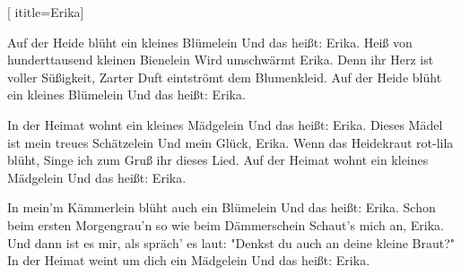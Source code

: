  [
ititle={Erika}]

\beginverse
Auf der Heide blüht ein kleines Blümelein
Und das heißt: Erika.
Heiß von hunderttausend kleinen Bienelein
Wird umschwärmt Erika.
Denn ihr Herz ist voller Süßigkeit,
Zarter Duft eintströmt dem Blumenkleid.
Auf der Heide blüht ein kleines Blümelein
Und das heißt: Erika.
\endverse

\beginverse
In der Heimat wohnt ein kleines Mädgelein
Und das heißt: Erika.
Dieses Mädel ist mein treues Schätzelein
Und mein Glück, Erika.
Wenn das Heidekraut rot-lila blüht,
Singe ich zum Gruß ihr dieses Lied.
Auf der Heimat wohnt ein kleines Mädgelein
Und das heißt: Erika.
\endverse

\beginverse
In mein'm Kämmerlein blüht auch ein Blümelein
Und das heißt: Erika.
Schon beim ersten Morgengrau'n so wie beim Dämmerschein
Schaut's mich an, Erika.
Und dann ist es mir, als spräch' es laut:
"Denkst du auch an deine kleine Braut?"
In der Heimat weint um dich ein Mädgelein
Und das heißt: Erika.
\endverse
\endsong
